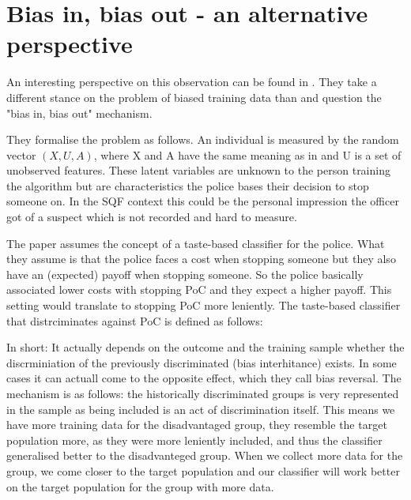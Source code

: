 \section*{Bias in, bias out - an alternative perspective}

An interesting perspective on this observation can be found in \cite{RambachanBBOEFW}. They take a different stance on the problem of biased training data than \cite{kallus} and question the "bias in, bias out" mechanism.

They formalise the problem as follows. An individual is measured by the random vector $(X, U, A)$, where X and A have the same meaning as in \cite{kallus}
and U is a set of unobserved features. These latent variables are unknown to the person training the algorithm but are characteristics the police bases their decision to stop someone on. In the SQF context this could be the personal impression the officer got of a suspect which is not recorded and hard to measure.

The paper assumes the concept of a taste-based classifier for the police. What they assume is that the police faces a cost when stopping someone but they also have an (expected) payoff when stopping someone. So the police basically associated lower costs with stopping PoC and they expect a higher payoff. This setting would translate to stopping PoC more leniently.
The taste-based classifier that distrciminates against PoC is defined as follows:

In short: It actually depends on the outcome and the training sample whether the discrminiation of the previously discriminated (bias interhitance) exists. In some cases it can actuall come to the opposite effect, which they call bias reversal.
The mechanism is as follows: the historically discriminated groups is very represented in the sample as being included is an act of discrimination itself. This means we have more training data for the disadvantaged group, they resemble the target population more, as they were more leniently included, and thus the classifier generalised better to the disadvanteged group.
When we collect more data for the group, we come closer to the target population and our classifier will work better on the target population for the group with more data.


